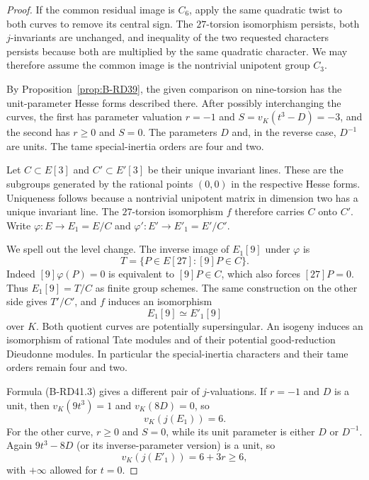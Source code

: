 \begin{proof}
If the common residual image is $C_6$, apply the same quadratic
twist to both curves to remove its central sign. The $27$-torsion
isomorphism persists, both $j$-invariants are unchanged, and
inequality of the two requested characters persists because both
are multiplied by the same quadratic character. We may therefore
assume the common image is the nontrivial unipotent group $C_3$.

By Proposition~\ref{prop:B-RD39}, the given comparison on nine-torsion
has the unit-parameter Hesse forms described there. After possibly
interchanging the curves, the first has parameter valuation $r=-1$
and $S=v_K(t^3-D)=-3$, and the second has $r\ge0$ and $S=0$.
The parameters $D$ and, in the reverse case, $D^{-1}$ are units.
The tame special-inertia orders are four and two.

Let $C\subset E[3]$ and $C'\subset E'[3]$ be their unique invariant
lines. These are the subgroups generated by the rational points
$(0,0)$ in the respective Hesse forms. Uniqueness follows because
a nontrivial unipotent matrix in dimension two has a unique invariant
line. The $27$-torsion isomorphism $f$ therefore carries $C$ onto $C'$.
Write $\varphi:E\to E_1=E/C$ and
$\varphi':E'\to E'_1=E'/C'$.

We spell out the level change. The inverse image of $E_1[9]$ under
$\varphi$ is
\[
 T=\{P\in E[27]:[9]P\in C\}.
\]
Indeed $[9]\varphi(P)=0$ is equivalent to $[9]P\in C$, which
also forces $[27]P=0$. Thus $E_1[9]=T/C$ as finite group schemes.
The same construction on the other side gives $T'/C'$, and $f$
induces an isomorphism
\[
                             E_1[9]\simeq E'_1[9]
                                                        \tag{B-RD41.6}
\]
over $K$. Both quotient curves are potentially supersingular.
An isogeny induces an isomorphism of rational Tate modules and of
their potential good-reduction Dieudonne modules. In particular the
special-inertia characters and their tame orders remain four and two.

Formula (B-RD41.3) gives a different pair of $j$-valuations. If
$r=-1$ and $D$ is a unit, then
$v_K(9t^3)=1$ and $v_K(8D)=0$, so
\[
                        v_K(j(E_1))=6.
\]
For the other curve, $r\ge0$ and $S=0$, while its unit parameter
is either $D$ or $D^{-1}$. Again $9t^3-8D$ (or its inverse-parameter
version) is a unit, so
\[
                       v_K(j(E'_1))=6+3r\ge6,
                                                        \tag{B-RD41.7}
\]
with $+\infty$ allowed for $t=0$.


\end{proof}
